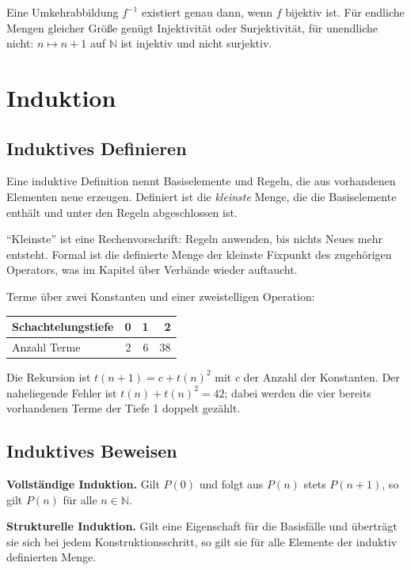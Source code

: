 \documentclass[12pt, a4paper]{article}
\begin{document}
Eine Umkehrabbildung $f^{-1}$ existiert genau dann, wenn $f$ bijektiv ist.
Für endliche Mengen gleicher Größe genügt Injektivität oder Surjektivität,
für unendliche nicht: $n \mapsto n+1$ auf $\mathbb{N}$ ist injektiv und
nicht surjektiv.

\section{Induktion}

\subsection{Induktives Definieren}

\begin{definitionbox}
Eine induktive Definition nennt Basiselemente und Regeln, die aus vorhandenen
Elementen neue erzeugen. Definiert ist die \emph{kleinste} Menge, die die
Basiselemente enthält und unter den Regeln abgeschlossen ist.
\end{definitionbox}

"`Kleinste"' ist eine Rechenvorschrift: Regeln anwenden, bis nichts Neues
mehr entsteht. Formal ist die definierte Menge der kleinste Fixpunkt des
zugehörigen Operators, was im Kapitel über Verbände wieder auftaucht.

\begin{examplebox}
Terme über zwei Konstanten und einer zweistelligen Operation:

\begin{center}
\begin{tabular}{lrrr}
\toprule
Schachtelungstiefe & 0 & 1 & 2\\
\midrule
Anzahl Terme & 2 & 6 & 38\\
\bottomrule
\end{tabular}
\end{center}

Die Rekursion ist $t(n+1) = c + t(n)^2$ mit $c$ der Anzahl der Konstanten.
Der naheliegende Fehler ist $t(n) + t(n)^2 = 42$; dabei werden die vier
bereits vorhandenen Terme der Tiefe 1 doppelt gezählt.
\end{examplebox}

\subsection{Induktives Beweisen}

\begin{definitionbox}
\textbf{Vollständige Induktion.} Gilt $P(0)$ und folgt aus $P(n)$ stets
$P(n+1)$, so gilt $P(n)$ für alle $n \in \mathbb{N}$.

\textbf{Strukturelle Induktion.} Gilt eine Eigenschaft für die Basisfälle und
überträgt sie sich bei jedem Konstruktionsschritt, so gilt sie für alle
Elemente der induktiv definierten Menge.
\end{definitionbox}
\end{document}
